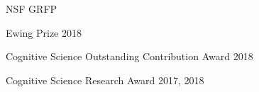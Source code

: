 




\iftrue


\begin{cvhonors}

  \cvhonor
    {NSF GRFP} %
    {} %
    {} %

\end{cvhonors}
\fi



\begin{cvhonors}

  \cvhonor
    {Ewing Prize} %
    {} %
    {2018} %

  \cvhonor
    {Cognitive Science Outstanding Contribution Award} %
    {} %
    {2018} %

  \cvhonor
    {Cognitive Science Research Award} %
    {} %
    {2017, 2018} %

\end{cvhonors}

\iffalse

\cvsubsection{Not Funded}

\begin{cvhonors}

  \cvhonor
    {3rd Place} %
    {WITHCON Hacking Competition Final} %
    {Seoul, S.Korea} %
    {2015} %

  \cvhonor
    {Silver Prize} %
    {KISA HDCON Hacking Competition Final} %
    {Seoul, S.Korea} %
    {2017} %

\end{cvhonors}
\fi

